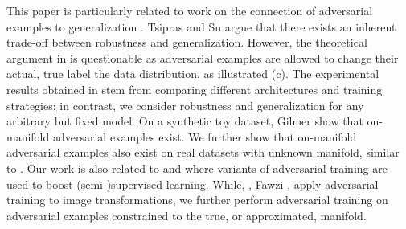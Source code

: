 This paper is particularly related to work on the connection of adversarial examples to generalization \cite{TsiprasARXIV2018,SuARXV2018,GilmerICLRWORK2018,RozsaICMLA2016}. Tsipras \etal \cite{TsiprasARXIV2018} and Su \etal \cite{SuARXV2018} argue that there exists an inherent trade-off between robustness and generalization. However, the theoretical argument in \cite{TsiprasARXIV2018} is questionable as adversarial examples are allowed to change their actual, true label \wrt the data distribution, as illustrated  (c). The experimental results obtained in \cite{SuARXV2018,RozsaICMLA2016} stem from comparing different architectures and training strategies; in contrast, we consider robustness and generalization for any arbitrary but fixed model. On a  synthetic toy dataset, Gilmer \etal \cite{GilmerICLRWORK2018} show that on-manifold adversarial examples exist. We further show that on-manifold adversarial examples also exist on real datasets with unknown manifold, similar to \cite{ZhaoICLR2018}.  Our work is also related to \cite{FawziICIP2016} and \cite{MiyatoICLR2016,MiyatoPAMI2018} where variants of adversarial training are used to boost (semi-)supervised learning. While, \eg, Fawzi \etal \cite{FawziICIP2016}, apply adversarial training to image transformations, we further perform adversarial training on adversarial examples constrained to the true, or approximated, manifold.  